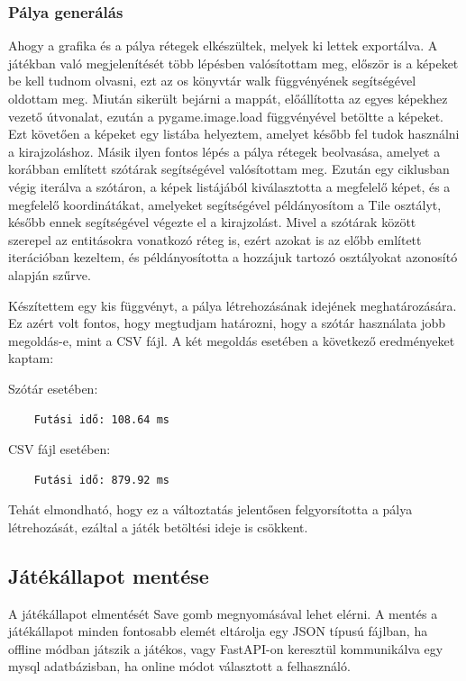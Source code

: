 \subsubsection{Pálya generálás}

\indent \indent Ahogy a grafika és a pálya rétegek elkészültek, melyek ki lettek exportálva. A játékban való megjelenítését több lépésben valósítottam meg, először is a képeket be kell tudnom olvasni, ezt az os könyvtár walk függvényének segítségével oldottam meg. Miután sikerült bejárni a mappát, előállította az egyes képekhez vezető útvonalat, ezután a pygame.image.load függvényével betöltte a képeket. Ezt követően a képeket egy listába helyeztem, amelyet később fel tudok használni a kirajzoláshoz. Másik ilyen fontos lépés a pálya rétegek beolvasása, amelyet a korábban említett szótárak segítségével valósítottam meg. Ezután egy ciklusban végig iterálva a szótáron, a képek listájából kiválasztotta a megfelelő képet, és a megfelelő koordinátákat, amelyeket segítségével példányosítom a Tile osztályt, később ennek segítségével végezte el a kirajzolást. Mivel a szótárak között szerepel az entitásokra vonatkozó réteg is, ezért azokat is az előbb említett iterációban kezeltem, és példányosította a hozzájuk tartozó osztályokat azonosító alapján szűrve.

Készítettem egy kis függvényt, a pálya létrehozásának idejének meghatározására. Ez azért volt fontos, hogy megtudjam határozni, hogy a szótár használata jobb megoldás-e, mint a CSV fájl. A két megoldás esetében a következő eredményeket kaptam:

Szótár esetében:
\begin{verbatim}
    Futási idő: 108.64 ms
\end{verbatim}
CSV fájl esetében:
\begin{verbatim}
    Futási idő: 879.92 ms
\end{verbatim}

\indent \indent Tehát elmondható, hogy ez a változtatás jelentősen felgyorsította a pálya létrehozását, ezáltal a játék betöltési ideje is csökkent.


\subsection{Játékállapot mentése}
\indent \indent A játékállapot elmentését Save gomb megnyomásával lehet elérni. A mentés a játékállapot minden fontosabb elemét eltárolja egy JSON típusú fájlban, ha offline módban játszik a játékos, vagy FastAPI-on keresztül kommunikálva egy mysql adatbázisban, ha online módot választott a felhasználó.


